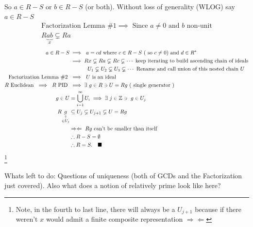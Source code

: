 \begin{lemma}
So $a\in R-S$ or $b\in R-S$ (or both). Without loss of generality (WLOG) say $a\in R-S$
\begin{align*}
    \text{Factorization Lemma \#1} \implies \text{ Since }a\neq 0 \text{ and }b \text{ non-unit}\\
    R\underbrace{ab}_{x}\varsubsetneq Ra
\end{align*}
\begin{align*}
    a\in R-S &\implies \ a=cd \text{ where }c\in R-S \ (\text{ so }c\neq 0) \text{ and }d\in R^* \\
    &\implies Rx \varsubsetneq Ra \varsubsetneq Rc \varsubsetneq \cdots \text{ keep iterating to build ascending chain of ideals} \\
    &\ \ \ \ \ \ \ \ \ \ U_1 \varsubsetneq U_2 \varsubsetneq U_3 \varsubsetneq \cdots \text{ Rename and call union of this nested chain }U \\
    \text{Factorization Lemma \#2 }&\implies \ U \text{ is an ideal} \\
    R \text{ Euclidean }\implies \ R \text{ PID } &\implies \exists \ g\in R \ni U=Rg \ (\text{ single generator })\\
    g\in U &= \bigcup_{i=1}^\infty U_i \implies \exists \ j \in {\mathbb{Z}} \ni \ g\in U_j  \\
    R\underset{\substack{\uparrow \\ \in U_j}}{g} &\subseteq U_j \varsubsetneq U_{j+1} \varsubsetneq U = Rg \\
    &\Rightarrow \Leftarrow \ Rg \text{ can't be smaller than itself} \\
    &\therefore R-S=\emptyset \\
    &\therefore R=S. \ \ \ \blacksquare
\end{align*} \footnote{Note, in the fourth to last line, there will always be a $U_{j+1}$ because if there weren't $x$ would admit a finite composite representation $\Rightarrow \Leftarrow$ }
\end{lemma}

Whats left to do: Questions of uniqueness (both of GCDs and the Factorization just covered). Also
what does a notion of relatively prime look like here?

